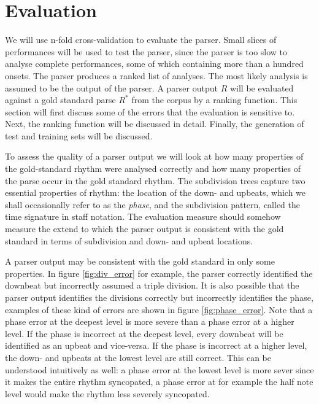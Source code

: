 \chapter{Evaluation}
\label{sec:evaluation}




We will use n-fold cross-validation to evaluate the parser. Small slices of performances will be used to test the parser, since the parser is too slow to analyse complete performances, some of which containing more than a hundred onsets.  The parser produces a ranked list of analyses. The most likely analysis is assumed to be the output of the parser. A parser output $R$ will be evaluated against a gold standard parse $R^*$ from the corpus by a ranking function. This section will first discuss some of the errors that the evaluation is sensitive to. Next, the ranking function will be discussed in detail. Finally, the generation of test and training sets will be discussed.

To assess the quality of a parser output we will look at how many properties of the gold-standard rhythm were analysed correctly and how many properties of the parse occur in the gold standard rhythm. The subdivision trees capture two essential properties of rhythm: the location of the down- and upbeats, which we shall occasionally refer to as the \textit{phase}, and the subdivision pattern, called the time signature in staff notation. The evaluation measure should somehow measure the extend to which the parser output is consistent with the gold standard in terms of subdivision and down- and upbeat locations. 

A parser output may be consistent with the gold standard in only some properties. In figure \ref{fig:div_error} for example, the parser correctly identified the downbeat but incorrectly assumed a triple division. It is also possible that the parser output identifies the divisions correctly but incorrectly identifies the phase, examples of these kind of errors are shown in figure \ref{fig:phase_error}. Note that a phase error at the deepest level is more severe than a phase error at a higher level. If the phase is incorrect at the deepest level, every downbeat will be identified as an upbeat and vice-versa. If the phase is incorrect at a higher level, the down- and upbeats at the lowest level are still correct. This can be understood intuitively as well: a phase error at the lowest level is more sever since it makes the entire rhythm syncopated, a phase error at for example the half note level would make the rhythm less severely syncopated.

